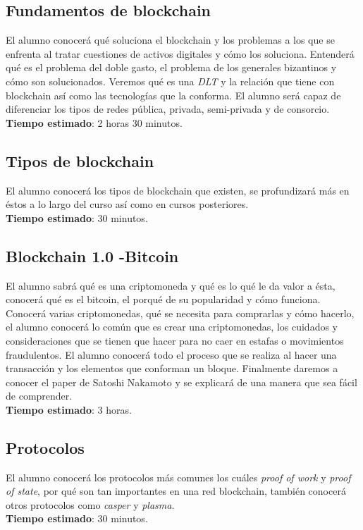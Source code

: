 \documentclass[a4paper,12pt]{lib/pub}
\begin{document}
\subsection{Fundamentos de blockchain}
El alumno conocerá qué soluciona el blockchain y los problemas a los que se enfrenta al tratar cuestiones de activos digitales y cómo los soluciona. Entenderá qué es el problema del doble gasto, el problema de los generales bizantinos y cómo son solucionados. Veremos qué es una \textit{DLT} y la relación que tiene con blockchain así como las tecnologías que la conforma. El alumno será capaz de diferenciar los tipos de redes pública, privada, semi-privada y de consorcio.\\
\textbf{Tiempo estimado}: 2 horas 30 minutos.

\subsection{Tipos de blockchain}
El alumno conocerá los tipos de blockchain que existen, se profundizará más en éstos a lo largo del curso así como en cursos posteriores.\\
\textbf{Tiempo estimado}: 30 minutos.

\subsection{Blockchain 1.0 -Bitcoin}
El alumno sabrá qué es una criptomoneda y qué es lo qué le da valor a ésta, conocerá qué es el bitcoin, el porqué de su popularidad y cómo funciona. Conocerá varias criptomonedas, qué se necesita para comprarlas y cómo hacerlo, el alumno conocerá lo común que es crear una criptomonedas, los cuidados y consideraciones que se tienen que hacer para no caer en estafas o movimientos fraudulentos. El alumno conocerá todo el proceso que se realiza al hacer una transacción y los elementos que conforman un bloque. Finalmente daremos a conocer el paper de Satoshi Nakamoto y se explicará de una manera que sea fácil de comprender.\\
\textbf{Tiempo estimado}: 3 horas.
\newpage
\subsection{Protocolos}
El alumno conocerá los protocolos más comunes los cuáles \textit{proof of work} y \textit{proof of state}, por qué son tan importantes en una red blockchain, también conocerá otros protocolos como \textit{casper} y \textit{plasma}.\\
\textbf{Tiempo estimado}: 30 minutos.
\end{document}
